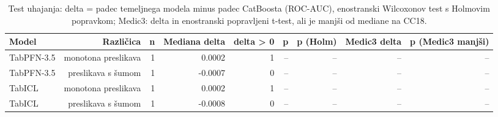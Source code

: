 \begin{table}[htbp]
\centering
\caption{Test uhajanja: delta = padec temeljnega modela minus padec CatBoosta (ROC-AUC), enostranski Wilcoxonov test s Holmovim popravkom; Medic3: delta in enostranski popravljeni t-test, ali je manjši od mediane na CC18.}
\label{tab:uhajanje}
\begin{tabular}{lrrrrrrrr}
\hline
Model & Različica & n & Mediana delta & delta > 0 & p & p (Holm) & Medic3 delta & p (Medic3 manjši) \\
\hline
TabPFN-3.5 & monotona preslikava & 1 & 0.0002 & 1 & -- & -- & -- & -- \\
TabPFN-3.5 & preslikava s šumom & 1 & -0.0007 & 0 & -- & -- & -- & -- \\
TabICL & monotona preslikava & 1 & 0.0002 & 1 & -- & -- & -- & -- \\
TabICL & preslikava s šumom & 1 & -0.0008 & 0 & -- & -- & -- & -- \\
\hline
\end{tabular}
\end{table}
